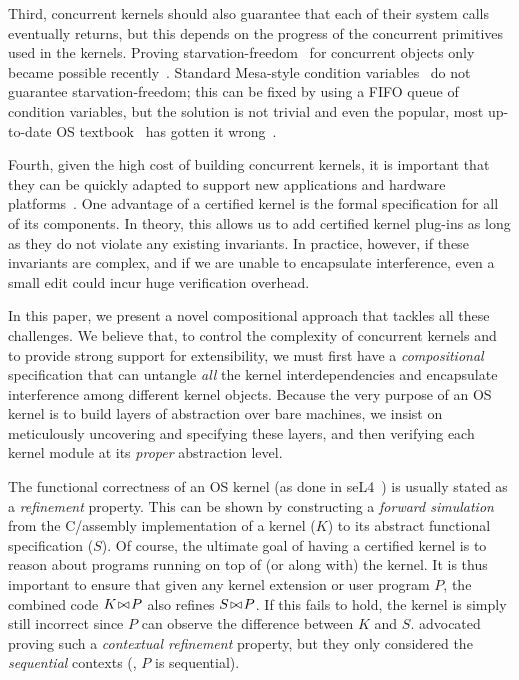 {Third, concurrent kernels should also guarantee that each of their
system calls eventually returns, but this depends on the progress of
the concurrent primitives used in the kernels. Proving
starvation-freedom~\cite{Herlihy08book} for concurrent objects only
became possible recently~\cite{lili16}.  Standard Mesa-style condition
variables~\cite{lampson80} do not guarantee starvation-freedom; this
can be fixed by using a FIFO queue of condition variables, but the
solution is not trivial and even the popular, most up-to-date OS
textbook~\cite[fig~5.14]{ospp11} has gotten it
wrong~\cite{anderson16}.

Fourth, given the high cost of building concurrent kernels, it is
important that they can be quickly adapted to support new applications
and hardware platforms~\cite{bershad95,engler95,hunt07,unikernel13}.
One advantage of a certified kernel is the formal specification for
all of its components. In theory, this allows us to add certified
kernel plug-ins as long as they do not violate any existing
invariants.  In practice, however, if these invariants are complex,
and if we are unable to encapsulate interference, even a small edit
could incur huge verification overhead.

In this paper, we present a novel compositional approach that tackles
all these challenges. We believe that, to control the complexity of
concurrent kernels and to provide strong support for extensibility, we
must first have a {\em compositional} specification that can untangle
{\em all} the kernel interdependencies and encapsulate interference
among different kernel objects. Because the very purpose of an OS
kernel is to build layers of abstraction over bare machines, we insist
on meticulously uncovering and specifying these layers, and then
verifying each kernel module at its {\em proper} abstraction level.

The functional correctness of an OS kernel (as done in
seL4~\cite{klein14}) is usually stated as a {\em refinement}
property. This can be shown by constructing a {\em forward
  simulation}~\cite{Lynch95} from the C/assembly implementation of a
kernel ($K$) to its abstract functional specification ($S$). Of
course, the ultimate goal of having a certified kernel is to reason
about programs running on top of (or along with) the kernel. It is
thus important to ensure that given any kernel extension or user
program $P$, the combined code $K\!\bowtie\!{}P$ also refines
$S\!\bowtie\!{}P$. If this fails to hold, the kernel is simply still
incorrect since $P$ can observe the difference between $K$
and $S$. \citet{dscal15} advocated proving such a {\em
contextual refinement} property, but they only considered the {\em
sequential} contexts (\ie, $P$ is sequential).

}
